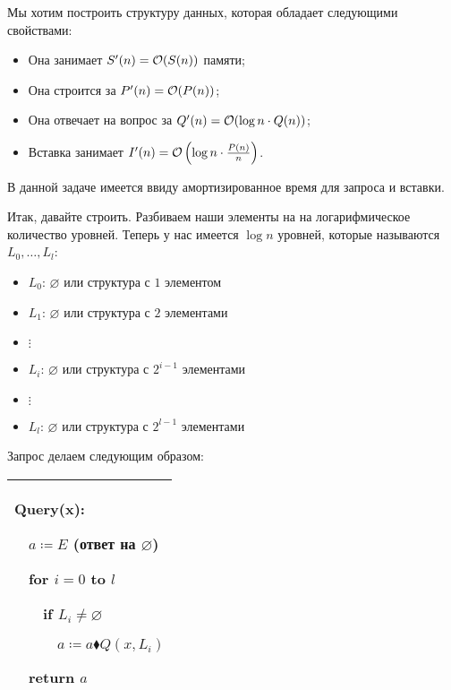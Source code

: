 \begin{task}
	Мы хотим построить структуру данных, которая обладает следующими свойствами:

	\begin{itemize}
		\item Она занимает $S^\prime(n) = \mathcal{O}(S(n))$ памяти;

		\item Она строится за $P^\prime(n) = \mathcal{O}(P(n))$;

		\item Она отвечает на вопрос за $Q^\prime(n) = \mathcal{O}(\log n \cdot Q(n))$;

		\item Вставка занимает $I^\prime(n) = \mathcal{O}\left(\log n \cdot \frac{P(n)}{n}\right)$.
	\end{itemize}

	В данной задаче имеется ввиду амортизированное время для запроса и вставки.
\end{task}

Итак, давайте строить. Разбиваем наши элементы на на логарифмическое количество уровней. Теперь у нас имеется $\log n$ уровней, которые называются $L_0, \ldots, L_l$:
\begin{itemize}
	\item $L_0$: $\varnothing$ или структура с $1$ элементом

	\item $L_1$: $\varnothing$ или структура с $2$ элементами

	\item[]{$\vdots$}

	\item $L_i$: $\varnothing$ или структура с $2^{i - 1}$ элементами

	\item[]{$\vdots$}

	\item $L_l$: $\varnothing$ или структура с $2^{l - 1}$ элементами
\end{itemize}

Запрос делаем следующим образом:


\begin{tabular}{|p{4cm}|}
	\hline
	Query(x):

	$\quad$$a \coloneqq E$ (ответ на $\varnothing$)

		$\quad$for $i = 0$ to $l$

	$\quad$$\quad$if $L_i \ne \varnothing$

	$\quad$$\quad$$\quad$$a \coloneqq a \blacklozenge Q(x, L_i)$

	$\quad$return $a$ \\
	\hline
\end{tabular}


